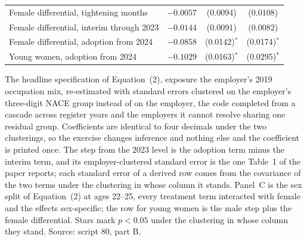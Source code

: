 \begin{table}[ht!]
\begin{tabular}{lccc}
Female differential, tightening months & $-0.0057$ & (0.0094) & (0.0108) \\
Female differential, interim through 2023 & $-0.0144$ & (0.0091) & (0.0082) \\
Female differential, adoption from 2024 & $-0.0858$ & (0.0142)$^{*}$ & (0.0174)$^{*}$ \\
Young women, adoption from 2024 & $-0.1029$ & (0.0163)$^{*}$ & (0.0295)$^{*}$ \\
\bottomrule
\end{tabular}
\begin{minipage}{0.9\textwidth}\footnotesize\vspace{4pt}
The headline specification of Equation~(2), exposure the employer's 2019 occupation mix, re-estimated with standard errors clustered on the employer's three-digit NACE group instead of on the employer, the code completed from a cascade across register years and the employers it cannot resolve sharing one residual group. Coefficients are identical to four decimals under the two clusterings, so the exercise changes inference and nothing else and the coefficient is printed once. The step from the 2023 level is the adoption term minus the interim term, and its employer-clustered standard error is the one Table~1 of the paper reports; each standard error of a derived row comes from the covariance of the two terms under the clustering in whose column it stands. Panel~C is the sex split of Equation~(2) at ages 22--25, every treatment term interacted with female and the effects sex-specific; the row for young women is the male step plus the female differential. Stars mark $p<0.05$ under the clustering in whose column they stand. Source: script 80, part B.
\end{minipage}
\end{table}

